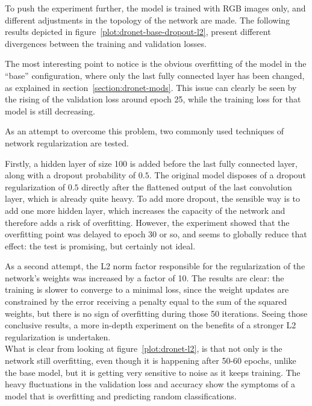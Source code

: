 To push the experiment further, the model is trained with RGB images only, and
different adjustments in the topology of the network are made. The following
results depicted in figure~\ref{plot:dronet-base-dropout-l2}, present different
divergences between the training and validation losses.



The most interesting point to notice is the obvious overfitting of the model
in the ``base'' configuration, where only the last fully connected layer has
been changed, as explained in section~\ref{section:dronet-mods}. This issue can
clearly be seen by the rising of the validation loss around epoch 25, while the
training loss for that model is still decreasing.

As an attempt to overcome this problem, two commonly used techniques of network
regularization are tested.

Firstly, a hidden layer of size 100 is added before the last fully connected
layer, along with a dropout probability of $0.5$. The original model disposes
of a dropout regularization of $0.5$ directly after the flattened output of the
last convolution layer, which is already quite heavy. To add more dropout, the
sensible way is to add one more hidden layer, which increases the capacity of
the network and therefore adds a risk of overfitting. However, the experiment
showed that the overfitting point was delayed to epoch 30 or so, and seems to
globally reduce that effect: the test is promising, but certainly not ideal.


As a second attempt, the L2 norm factor responsible for the regularization of
the network's weights was increased by a factor of 10. The results are clear:
the training is slower to converge to a minimal loss, since the weight updates
are constrained by the error receiving a penalty equal to the sum of the
squared weights, but there is no sign of overfitting during those 50
iterations. Seeing those conclusive results, a more in-depth experiment on the
benefits of a stronger L2 regularization is undertaken.\\



What is clear from looking at figure~\ref{plot:dronet-l2}, is that not only is
the network still overfitting, even though it is happening after 50-60 epochs,
unlike the base model, but it is getting very sensitive to noise as it keeps
training. The heavy fluctuations in the validation loss and accuracy show the
symptoms of a model that is overfitting and predicting random classifications.


